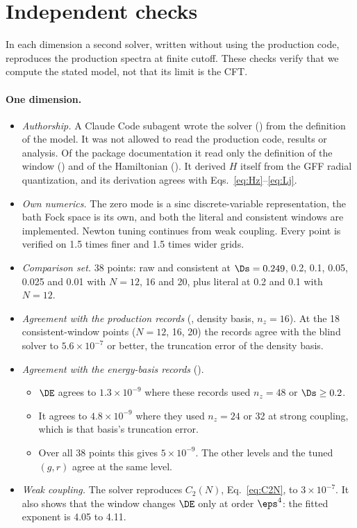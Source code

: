\section{Independent checks}\label{sec:checks}
In each dimension a second solver, written without using the production code, reproduces the production spectra at
finite cutoff. These checks verify that we compute the stated model, not that its limit is the CFT.

\paragraph{One dimension.}\label{d1:checks}
\begin{itemize}
\item \emph{Authorship.} A Claude Code subagent wrote the solver ()
 from the definition of the model. It was not allowed to read the production code, results or analysis. Of the
 package documentation it read only the definition of the window () and of the Hamiltonian
 (). It derived $H$ itself from the GFF radial
 quantization, and its derivation agrees with Eqs.~\eqref{eq:Hz}--\eqref{eq:Lj}.
\item \emph{Own numerics.} The zero mode is a sinc discrete-variable representation, the bath Fock space is its own,
 and both the literal and consistent windows are implemented. Newton tuning continues from weak coupling. Every point
 is verified on 1.5 times finer and 1.5 times wider grids.
\item \emph{Comparison set.} 38 points: raw and consistent at $\Ds=0.249$, 0.2, 0.1, 0.05, 0.025 and 0.01 with
 $N=12$, 16 and 20, plus literal at 0.2 and 0.1 with $N=12$.
\item \emph{Agreement with the production records} (, density basis, $n_z=16$). At the 18
 consistent-window points ($N=12$, 16, 20) the records agree with the blind solver to $5.6\times10^{-7}$ or better,
 the truncation error of the density basis.
\item \emph{Agreement with the energy-basis records} ().
 \begin{itemize}
 \item $\DE$ agrees to $1.3\times10^{-9}$ where these records used $n_z=48$ or $\Ds\ge0.2$.
 \item It agrees to $4.8\times10^{-9}$ where they used $n_z=24$ or 32 at strong coupling, which is that basis's
 truncation error.
 \item Over all 38 points this gives $5\times10^{-9}$. The other levels and the tuned $(g,r)$ agree at the same level.
 \end{itemize}
\item \emph{Weak coupling.} The solver reproduces $C_2(N)$, Eq.~\eqref{eq:C2N}, to $3\times10^{-7}$. It also shows
 that the window changes $\DE$ only at order $\eps^4$: the fitted exponent is 4.05 to 4.11.
\end{itemize}




